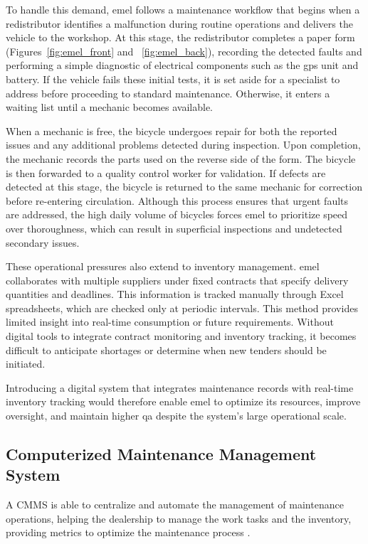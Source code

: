 To handle this demand, \ac{emel} follows a maintenance workflow that begins when a redistributor identifies a malfunction during routine operations and delivers the vehicle to the workshop. At this stage, the redistributor completes a paper form (Figures~\ref{fig:emel_front} and ~\ref{fig:emel_back}), recording the detected faults and performing a simple diagnostic of electrical components such as the \ac{gps} unit and battery. If the vehicle fails these initial tests, it is set aside for a specialist to address before proceeding to standard maintenance. Otherwise, it enters a waiting list until a mechanic becomes available.

When a mechanic is free, the bicycle undergoes repair for both the reported issues and any additional problems detected during inspection. Upon completion, the mechanic records the parts used on the reverse side of the form. The bicycle is then forwarded to a quality control worker for validation. If defects are detected at this stage, the bicycle is returned to the same mechanic for correction before re-entering circulation. Although this process ensures that urgent faults are addressed, the high daily volume of bicycles forces \ac{emel} to prioritize speed over thoroughness, which can result in superficial inspections and undetected secondary issues.

These operational pressures also extend to inventory management. \ac{emel} collaborates with multiple suppliers under fixed contracts that specify delivery quantities and deadlines. This information is tracked manually through Excel spreadsheets, which are checked only at periodic intervals. This method provides limited insight into real-time consumption or future requirements. Without digital tools to integrate contract monitoring and inventory tracking, it becomes difficult to anticipate shortages or determine when new tenders should be initiated.

Introducing a digital system that integrates maintenance records with real-time inventory tracking would therefore enable \ac{emel} to optimize its resources, improve oversight, and maintain higher \ac{qa} despite the system's large operational scale.


\subsection{Computerized Maintenance Management System}

A \ac{CMMS} is able to centralize and automate the management of maintenance operations, helping the dealership to manage the work tasks and the inventory, providing metrics to optimize the maintenance process \cite{CMMS_2020, Ibm_2025a, Besiktepe_2020}.

